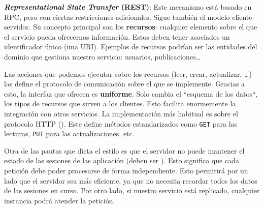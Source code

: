 \textbf{\emph{Representational State Transfer} (REST)}: Este mecanismo está basado en RPC, pero con ciertas restricciones adicionales. \cite{taylorSoftwareArchitectureFoundations2009} Sigue también el modelo cliente-servidor. Su concepto principal son los \textbf{recursos}: cualquier elemento sobre el que el servicio pueda ofrecernos información. Estos deben tener asociados un identificador único (una URI). \cite{richardsonRESTfulWebServices2007} Ejemplos de recursos podrían ser las entidades del dominio que gestiona nuestro servicio: usuarios, publicaciones\dots

Las acciones que podemos ejecutar sobre los recursos (leer, crear, actualizar, \dots) las define el protocolo de comunicación sobre el que se implemente. Gracias a esto, la interfaz que ofrecen es \textbf{uniforme}. Solo cambia el ``esquema de los datos``, los tipos de recursos que sirven a los clientes. Esto facilita enormemente la integración con otros servicios. \cite{nallyRESTVsRPC2018} La implementación más habitual es sobre el protocolo HTTP (). Este define métodos estandarizados como \texttt{GET} para las lecturas, \texttt{PUT} para las actualizaciones, etc.

Otra de las pautas que dicta el estilo es que el servidor no puede mantener el estado de las sesiones de las aplicación (deben ser \textbf{}). Esto significa que cada petición debe poder procesarse de forma independiente. Esto permitirá por un lado que el servidor sea más eficiente, ya que no necesita recordar todos los datos de las sesiones en curso. Por otro lado, si nuestro servicio está replicado, cualquier instancia podrá atender la petición.

